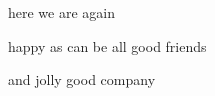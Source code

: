 \documentclass[a4paper]{article}
\begin{document}
    \noindent       here we are again\blah
\par\noindent       happy as can be\blah
\clearpage\noindent all good friends\blah
\par\noindent       and jolly good company\blah
\end{document}
